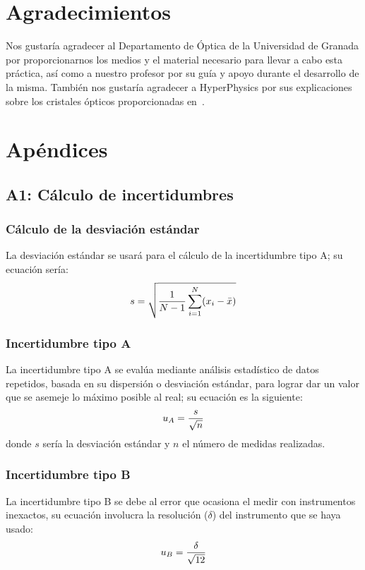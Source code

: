 \documentclass[10pt,onecolumn]{article}
\begin{document}
\section{Agradecimientos}
Nos gustaría agradecer al Departamento de Óptica de la Universidad de Granada por proporcionarnos
los medios y el material necesario para llevar a cabo esta práctica, así como a 
nuestro profesor por su guía y apoyo durante el desarrollo de la misma.
También nos gustaría agradecer a HyperPhysics por sus explicaciones sobre los cristales ópticos proporcionadas
en~\cite{CristalesOpticos}.

\newpage
\section{Apéndices}
\subsection{A1: Cálculo de incertidumbres} 
\subsubsection{Cálculo de la desviación estándar}
La desviación estándar se usará para el cálculo de la incertidumbre tipo A; su ecuación sería:
\begin{equation}\centering
    s = \sqrt{\dfrac{1}{N - 1} \sum_{i=1}^{N} (x_i - \bar{x})}
\end{equation}

\subsubsection{Incertidumbre tipo A}
La incertidumbre tipo A se evalúa mediante análisis estadístico de datos repetidos, basada en su dispersión o desviación estándar, para lograr dar un valor que se asemeje lo máximo posible al real; su ecuación es la siguiente:
\begin{equation}\centering
u_A = \dfrac{s}{\sqrt{n}}
\end{equation}
donde $s$ sería la desviación estándar y $n$ el número de medidas realizadas.

\subsubsection{Incertidumbre tipo B}
La incertidumbre tipo B se debe al error que ocasiona el medir con instrumentos inexactos, su ecuación involucra la resolución ($\delta$) del instrumento que se haya usado:
\begin{equation}\centering
    u_B = \dfrac{\delta}{\sqrt{12}}
\end{equation}
\end{document}
